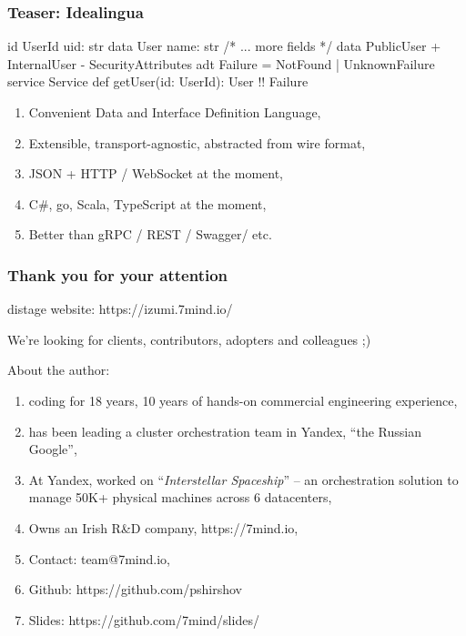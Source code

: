 \documentclass[usenames,dvipsnames]{beamer}
\begin{document}
\begin{frame}[fragile]
  \frametitle{Teaser: Idealingua}
  \begin{textcode}
id UserId { uid: str }
data User {  name: str /* ... more fields */ }
data PublicUser {
 + InternalUser
 - SecurityAttributes
}
adt Failure = NotFound | UnknownFailure
service Service {
  def getUser(id: UserId): User !! Failure
}
  \end{textcode}

\begin{enumerate}
\item Convenient Data and Interface Definition Language,
\item Extensible, transport-agnostic, abstracted from wire format,
\item JSON + HTTP / WebSocket at the moment,
\item C\#, go, Scala, TypeScript at the moment,
\item Better than gRPC / REST / Swagger/ etc.
\end{enumerate}
\end{frame}

\begin{frame}
    \frametitle{Thank you for your attention}

    \begin{center}
      distage website: https://izumi.7mind.io/

      We're looking for clients, contributors, adopters and colleagues ;)
    \end{center}

    About the author:
    \begin{enumerate}
        \item coding for 18 years, 10 years of hands-on commercial engineering experience,
        \item has been leading a cluster orchestration team in Yandex, ``the Russian Google'',
        \item At Yandex, worked on ``\textit{Interstellar Spaceship}'' -- an orchestration solution to manage 50K+ physical machines across 6 datacenters,
        \item Owns an Irish R\&D company, https://7mind.io,
        \item Contact: team@7mind.io,
        \item Github: https://github.com/pshirshov
        \item Slides: https://github.com/7mind/slides/
    \end{enumerate}
\end{frame}
\end{document}
